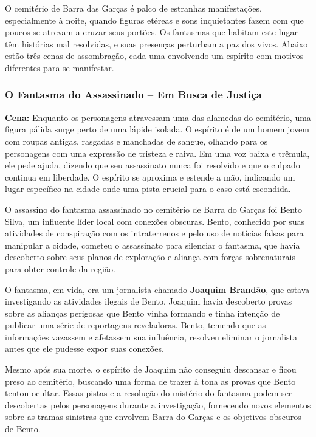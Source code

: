 O cemitério de Barra das Garças é palco de estranhas manifestações, especialmente à noite, quando figuras etéreas e sons inquietantes fazem com que poucos se atrevam a cruzar seus portões. Os fantasmas que habitam este lugar têm histórias mal resolvidas, e suas presenças perturbam a paz dos vivos. Abaixo estão três cenas de assombração, cada uma envolvendo um espírito com motivos diferentes para se manifestar.

\subsubsection{O Fantasma do Assassinado – Em Busca de Justiça}

\textbf{Cena:} Enquanto os personagens atravessam uma das alamedas do cemitério, uma figura pálida surge perto de uma lápide isolada. O espírito é de um homem jovem com roupas antigas, rasgadas e manchadas de sangue, olhando para os personagens com uma expressão de tristeza e raiva. Em uma voz baixa e trêmula, ele pede ajuda, dizendo que seu assassinato nunca foi resolvido e que o culpado continua em liberdade. O espírito se aproxima e estende a mão, indicando um lugar específico na cidade onde uma pista crucial para o caso está escondida.

O assassino do fantasma assassinado no cemitério de Barra do Garças foi Bento Silva, um influente líder local com conexões obscuras. Bento, conhecido por suas atividades de conspiração com os intraterrenos e pelo uso de notícias falsas para manipular a cidade, cometeu o assassinato para silenciar o fantasma, que havia descoberto sobre seus planos de exploração e aliança com forças sobrenaturais para obter controle da região. 

O fantasma, em vida, era um jornalista chamado \textbf{Joaquim Brandão}, que estava investigando as atividades ilegais de Bento. Joaquim havia descoberto provas sobre as alianças perigosas que Bento vinha formando e tinha intenção de publicar uma série de reportagens reveladoras. Bento, temendo que as informações vazassem e afetassem sua influência, resolveu eliminar o jornalista antes que ele pudesse expor suas conexões.

Mesmo após sua morte, o espírito de Joaquim não conseguiu descansar e ficou preso ao cemitério, buscando uma forma de trazer à tona as provas que Bento tentou ocultar. Essas pistas e a resolução do mistério do fantasma podem ser descobertas pelos personagens durante a investigação, fornecendo novos elementos sobre as tramas sinistras que envolvem Barra do Garças e os objetivos obscuros de Bento.


